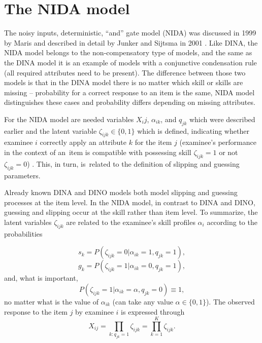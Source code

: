 \documentclass[english]{pwr_wmat_praca_dyplomowa}
\theoremstyle{plain}
\theoremstyle{definition}
\numberwithin{theorem}{chapter}
\begin{document}
\section{The NIDA model}

The noisy inputs, deterministic, ``and'' gate model (NIDA) was discussed in 1999 by Maris \cite{nida_maris} and described in detail by Junker and Sijtsma in 2001 \cite{nida_model}. Like DINA, the NIDA model belongs to the non-compensatory type of models, and the same as the DINA model it is an example of models with a conjunctive condensation rule (all required attributes need to be present). The difference between those two models is that in the DINA model there is no matter which skill or skills are missing -- probability for a correct response to an item is the same, NIDA model distinguishes these cases and probability differs depending on missing attributes. 

For the NIDA model are needed variables $X_ij$, $\alpha_{ik}$, and $q_{jk}$ which were described earlier and the latent variable $\zeta_{ijk} \in \{0,1\}$ which is defined, indicating whether examinee $i$ correctly apply an attribute $k$ for the item $j$ (examinee's performance in the context of an~item is compatible with possessing skill $\zeta_{ijk}=1$ or not $\zeta_{ijk}=0$) \cite{book_tables}. This, in turn, is~related to the definition of slipping and guessing parameters.

Already known DINA and DINO models both model slipping and guessing processes at the item level. In the NIDA model, in contrast to DINA and DINO, guessing and slipping occur at the skill rather than item level. To summarize, the latent variables $\zeta_{ijk}$ are related to the examinee's skill profiles $\alpha_{i}$ according to the probabilities

\begin{equation}
s_k = P(\zeta_{ijk} = 0 | \alpha_{ik} = 1, q_{jk} = 1),
\end{equation}
\begin{equation}
g_k = P(\zeta_{ijk} = 1 | \alpha_{ik} = 0, q_{jk} = 1),
\end{equation}
and, what is important,
\begin{equation}
P(\zeta_{ijk} = 1 | \alpha_{ik} = \alpha, q_{jk} = 0) \equiv 1,
\end{equation}
no matter what is the value of $\alpha_{ik}$ (can take any value $\alpha \in \{0,1\}$). The observed response to the item $j$ by examinee $i$ is expressed through
\begin{equation}
X_{ij} = \prod\limits_{k: q_{jk}=1} \zeta_{ijk} = \prod\limits_{k=1}^{K} \zeta_{ijk}.
\end{equation}
\end{document}
